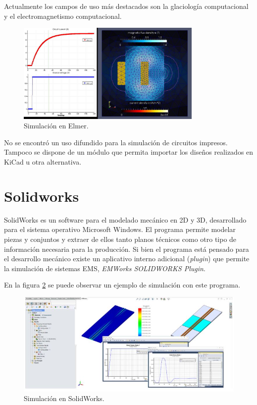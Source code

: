\documentclass[
    11pt,
    spanish,
    a4paper
]{article}
\begin{document}
Actualmente los campos de uso más destacados son la glaciología computacional y el electromagnetismo computacional.

\begin{figure}[htbp]
	\centering
	\includegraphics[width=0.8\textwidth]{img/elmer.jpg}
	\caption{Simulación en Elmer.}
	\label{fig:elmer}
\end{figure}

No se encontró un uso difundido para la simulación de circuitos impresos.
Tampoco se dispone de un módulo que permita importar los diseños realizados en KiCad u otra alternativa.


\section{Solidworks}

SolidWorks es un software para el modelado mecánico en 2D y 3D, desarrollado para el sistema operativo Microsoft Windows.
El programa permite modelar piezas y conjuntos y extraer de ellos tanto planos técnicos como otro tipo de información necesaria para la producción.
Si bien el programa está pensado para el desarrollo mecánico existe un aplicativo interno adicional (\emph{plugin}) que permite la simulación de sistemas EMS, \emph{EMWorks SOLIDWORKS Plugin}.

En la figura \ref{fig:solidworks} se puede observar un ejemplo de simulación con este programa.

\begin{figure}[htbp]
	\centering
	\includegraphics[width=1\textwidth]{img/solidWorks.jpeg}
	\caption{Simulación en SolidWorks.}
	\label{fig:solidworks}
\end{figure}
\end{document}
